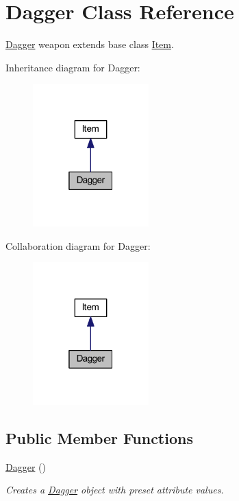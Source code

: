 \hypertarget{class_dagger}{}\section{Dagger Class Reference}
\label{class_dagger}


\mbox{\hyperlink{class_dagger}{Dagger}} weapon extends base class \mbox{\hyperlink{class_item}{Item}}.  




Inheritance diagram for Dagger\+:\nopagebreak
\begin{figure}[H]
\begin{center}
\leavevmode
\includegraphics[width=127pt]{class_dagger__inherit__graph}
\end{center}
\end{figure}


Collaboration diagram for Dagger\+:\nopagebreak
\begin{figure}[H]
\begin{center}
\leavevmode
\includegraphics[width=127pt]{class_dagger__coll__graph}
\end{center}
\end{figure}
\subsection*{Public Member Functions}
\begin{DoxyCompactItemize}
\item 
\mbox{\hyperlink{class_dagger_ab5dedddec32dcbfc2111820e3fda4e7f}{Dagger}} ()
\begin{DoxyCompactList}\small\item\em Creates a \mbox{\hyperlink{class_dagger}{Dagger}} object with preset attribute values. \end{DoxyCompactList}\end{DoxyCompactItemize}


